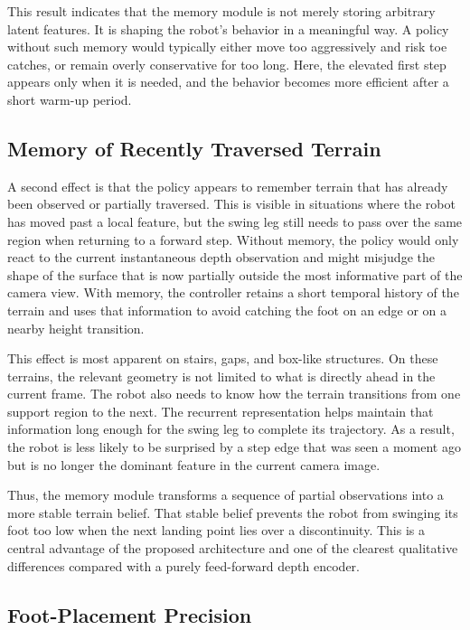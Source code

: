 This result indicates that the memory module is not merely storing arbitrary latent features. It is shaping the robot's behavior in a meaningful way. A policy without such memory would typically either move too aggressively and risk toe catches, or remain overly conservative for too long. Here, the elevated first step appears only when it is needed, and the behavior becomes more efficient after a short warm-up period.

\subsection{Memory of Recently Traversed Terrain}
\label{sec:memory_of_terrain}

A second effect is that the policy appears to remember terrain that has already been observed or partially traversed. This is visible in situations where the robot has moved past a local feature, but the swing leg still needs to pass over the same region when returning to a forward step. Without memory, the policy would only react to the current instantaneous depth observation and might misjudge the shape of the surface that is now partially outside the most informative part of the camera view. With memory, the controller retains a short temporal history of the terrain and uses that information to avoid catching the foot on an edge or on a nearby height transition.

This effect is most apparent on stairs, gaps, and box-like structures. On these terrains, the relevant geometry is not limited to what is directly ahead in the current frame. The robot also needs to know how the terrain transitions from one support region to the next. The recurrent representation helps maintain that information long enough for the swing leg to complete its trajectory. As a result, the robot is less likely to be surprised by a step edge that was seen a moment ago but is no longer the dominant feature in the current camera image.

Thus, the memory module transforms a sequence of partial observations into a more stable terrain belief. That stable belief prevents the robot from swinging its foot too low when the next landing point lies over a discontinuity. This is a central advantage of the proposed architecture and one of the clearest qualitative differences compared with a purely feed-forward depth encoder.

\subsection{Foot-Placement Precision}
\label{sec:foot_placement_precision}

